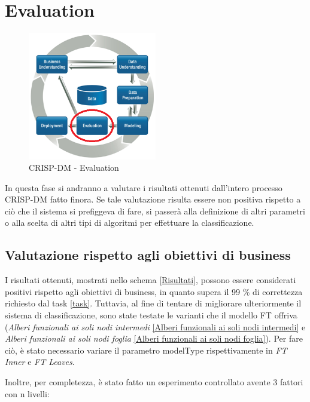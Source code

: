 \chapter{Evaluation}

\begin{figure}[hbtp]
	\centering
	\includegraphics[width=0.5\textwidth]{./images/CRISPDM_5.png}
	\caption{CRISP-DM - Evaluation}
	\label{CRISPDM_5}
\end{figure}
In questa fase si andranno a valutare i risultati ottenuti dall'intero processo CRISP-DM fatto finora. Se tale valutazione risulta essere non positiva rispetto a ciò che il sistema si prefiggeva di fare, si passerà alla definizione di altri parametri o alla scelta di altri tipi di algoritmi per effettuare la classificazione.
\pagebreak
\section{Valutazione rispetto agli obiettivi di business}
I risultati ottenuti, mostrati nello schema \ref{Risultati}, possono essere considerati positivi rispetto agli obiettivi di business, in quanto supera il 99 \% di correttezza richiesto dal task \ref{task}. 
Tuttavia, al fine di tentare di migliorare ulteriormente il sistema di classificazione, sono state testate le varianti che il modello FT offriva (\emph{Alberi funzionali ai soli nodi intermedi} \ref{Alberi funzionali ai soli nodi intermedi} e \emph{Alberi funzionali ai soli nodi foglia} \ref{Alberi funzionali ai soli nodi foglia}). Per fare ciò, è stato necessario variare il parametro modelType rispettivamente in \emph{FT Inner} e \emph{FT Leaves}.

Inoltre, per completezza, è stato fatto un esperimento controllato avente 3 fattori con n livelli:

